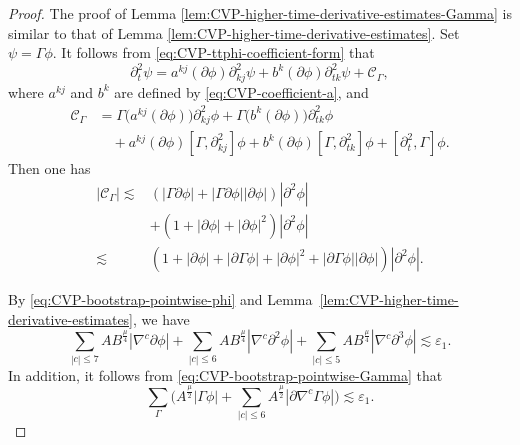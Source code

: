\documentclass[11pt,twoside]{article}
\def\f{\frac}
\def\p{\partial}
\def\ve{\varepsilon}
\def\ls{\lesssim}
\theoremstyle{plain}
\theoremstyle{definition}
\theoremstyle{assumption}
\numberwithin{equation}{section}
\begin{document}
	\begin{proof}
		The proof of Lemma \ref{lem:CVP-higher-time-derivative-estimates-Gamma}
			is similar to that of Lemma
			\ref{lem:CVP-higher-time-derivative-estimates}.		
		Set $\psi=\Gamma\phi.$
		It follows from \eqref{eq:CVP-ttphi-coefficient-form} that
		\begin{equation}
			\label{eq:CVP-Gamma-coefficient-form}
			\p_t^2\psi
			=a^{kj}(\p\phi)\p_{kj}^2\psi
			+b^k(\p\phi)\p_{tk}^2\psi
			+\mathcal C_\Gamma,
		\end{equation}
		where \(a^{kj}\) and \(b^k\) are defined by
		\eqref{eq:CVP-coefficient-a}, and
		\begin{equation}
			\label{eq:CVP-CGamma-schematic}
			\begin{aligned}
				\mathcal C_\Gamma
				&=\Gamma\bigl(a^{kj}(\p\phi)\bigr)\p_{kj}^2\phi
				+\Gamma\bigl(b^k(\p\phi)\bigr)\p_{tk}^2\phi
				\\
				&\quad+a^{kj}(\p\phi)[\Gamma,\p_{kj}^2]\phi
				+b^k(\p\phi)[\Gamma,\p_{tk}^2]\phi
				+[\p_t^2,\Gamma]\phi.
			\end{aligned}
		\end{equation}
		Then one has
		\begin{equation}\label{eq:CVP-CGamma-estimate}
			\begin{aligned}
				|\mathcal C_\Gamma|
				\ls&\left(
				|\Gamma\p\phi|+|\Gamma\p\phi||\p\phi|
				\right)|\p^2\phi|\\
				&
				+\left(1+|\p\phi|+|\p\phi|^2
				\right)|\p^2\phi|\\
				\ls&\left(1+|\p\phi|+|\p\Gamma\phi|+|\p\phi|^2+|\p\Gamma\phi||\p\phi|
				\right)|\p^2\phi|.
			\end{aligned}
		\end{equation}
		
		By \eqref{eq:CVP-bootstrap-pointwise-phi} and
		Lemma~\ref{lem:CVP-higher-time-derivative-estimates}, we have
		\begin{equation}
			\label{eq:CVP-basic-ordinary-time-pointwise-for-Gamma}
			\sum_{|c|\le 7}
			AB^{\f\mu4}|\nabla^c\p\phi|
			+
			\sum_{|c|\le 6}
			AB^{\f\mu4}|\nabla^c\p^2\phi|
			+
			\sum_{|c|\le 5}
			AB^{\f\mu4}|\nabla^c\p^3\phi|
			\ls
			\ve_1.
		\end{equation}
		In addition, it follows from \eqref{eq:CVP-bootstrap-pointwise-Gamma} that
		\begin{equation}
			\label{eq:CVP-basic-Gamma-pointwise-from-bootstrap}
			\sum_{\Gamma}
			\big(
			A^{\frac{\mu}{2}}|\Gamma\phi|
			+
			\sum_{|c|\le 6}
			A^{\frac{\mu}{2}}
			|\p\nabla^c\Gamma\phi|
			\big)
			\ls
			\ve_1.
		\end{equation}
		

\end{proof}
\end{document}
